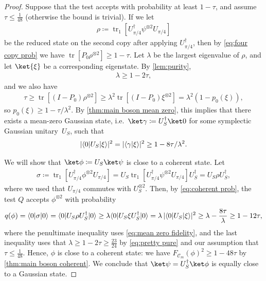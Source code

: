 \documentclass[11pt,a4paper]{article}
\numberwithin{equation}{section}
\newcommand{\ot}{\otimes}
\newcommand{\1}{\mathbf{1}}
\DeclareMathOperator{\tr}{tr}
\DeclarePairedDelimiter\abs{\lvert}{\rvert}
\DeclarePairedDelimiter\angles{\langle}{\rangle}
\DeclarePairedDelimiter\ip{\langle}{\rangle}
\begin{document}
\begin{proof}
    Suppose that the test accepts with probability at least $1 - \tau$, and assume $\tau \leq \frac{1}{48}$ (otherwise the bound is trivial). If we let
    \begin{align*}
        \rho \coloneqq \tr_1[U_{\pi/4}^\dagger \psi^{\ot 2} U_{\pi/4}]
    \end{align*}
    be the reduced state on the second copy after applying $U_{\pi/4}^\dagger$, then by \cref{eq:four copy prob} we have $\tr[P_0 \rho^{\ot 2}] \geq 1 - \tau$.
    Let $\lambda$ be the largest eigenvalue of $\rho$, and let $\ket{\xi}$ be a corresponding eigenstate.
    By \cref{lem:purity},
    \begin{align}\label{eq:pretty pure}
      \lambda \geq 1 - 2\tau,
    \end{align}
    and we also have
    \begin{align*}
        \tau \geq \tr[(I - P_0) \rho^{\ot 2}] \geq \lambda^2 \tr[(I - P_0) \xi^{\ot 2}] = \lambda^2 \left( 1 - p_0(\xi) \right),
    \end{align*}
    so $p_0(\xi) \geq 1 - \tau / \lambda^2$.
    By \cref{thm:main boson mean zero}, this implies that there exists a mean-zero Gaussian state, i.e.\ $\ket\gamma \coloneqq U_S^\dagger \ket0$ for some symplectic Gaussian unitary~$U_S$, such that
    \begin{align}\label{eq:mean zero fidelity}
      \abs{\angles{0 | U_S | \xi}}^2 = \abs{\angles{\gamma|\xi}}^2 \geq 1 - 8\tau / \lambda^2.
    \end{align}

    We will show that $\ket\phi \coloneqq U_S \ket\psi$ is close to a coherent state.
    Let
    \begin{align*}
      \sigma
    \coloneqq \tr_1[U_{\pi/4}^\dagger \phi^{\ot 2} U_{\pi/4}]
    = U_S \tr_1[U_{\pi/4}^\dagger \psi^{\ot 2} U_{\pi/4}] U_S^\dagger
    = U_S \rho U_S^\dagger,
    \end{align*}
    where we used that $U_{\pi/4}$ commutes with $U_S^{\ot 2}$.
    Then, by \cref{eq:coherent prob}, the test $Q$ accepts $\phi^{\ot 2}$ with probability
    \begin{align*}
      q(\phi)
    = \ip{0 | \sigma | 0 }
    = \ip{0 | U_S \rho U_S^\dagger | 0 }
    \geq \lambda \ip{0 | U_S \xi U_S^\dagger | 0 }
    = \lambda \, \abs{\ip{0 | U_S | \xi}}^2
    \geq \lambda - \frac {8\tau} \lambda
    \geq 1 - 12 \tau,
    \end{align*}
    where the penultimate inequality uses \cref{eq:mean zero fidelity}, and the last inequality uses that $\lambda \geq 1 - 2\tau \geq \frac{23}{24}$ by \cref{eq:pretty pure} and our assumption that~$\tau \leq \frac1{48}$.
    Hence, $\phi$ is close to a coherent state: we have
    $F_{\mathcal C_m}(\phi)^2 \geq 1 - 48\tau$ by \cref{thm:main boson coherent}.
    We conclude that $\ket\psi = U_S^\dagger \ket\phi$ is equally close to a Gaussian state.
\end{proof}
\end{document}
